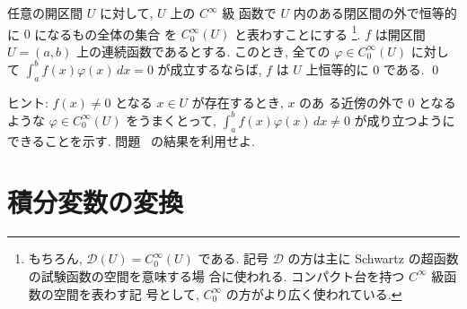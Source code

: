 \documentclass[12pt,twoside]{jarticle}
\newcommand\scr{\mathscr}
\begin{document}
\begin{question}[変分法の基本補題]
  任意の開区間 $U$ に対して, $U$ 上の $C^\infty$ 級
  函数で $U$ 内のある閉区間の外で恒等的に $0$ になるもの全体の集合
  を $C_0^\infty(U)$ と表わすことにする%
  \footnote{もちろん, $\scr{D}(U) = C_0^\infty(U)$ である. 記号 %
    $\scr{D}$ の方は主に Schwartz の超函数の試験函数の空間を意味する場
    合に使われる. コンパクト台を持つ $C^\infty$ 級函数の空間を表わす記
    号として, $C_0^\infty$ の方がより広く使われている.}. %
  $f$ は開区間 $U=(a,b)$ 上の連続函数であるとする. %
  このとき, 全ての $\varphi\in C_0^\infty(U)$ に対して%
  $\int_a^b f(x) \varphi(x) \,dx = 0$ が成立するならば, %
  $f$ は $U$ 上恒等的に $0$ である. \qed
\end{question}

\noindent ヒント: $f(x)\ne 0$ となる $x\in U$ が存在するとき, $x$ のあ
る近傍の外で $0$ となるような $\varphi\in C_0^\infty(U)$ をうまくとって, 
$\int_a^b f(x)\varphi(x)\,dx\ne 0$ が成り立つようにできることを示す. 
問題 \ の結果を利用せよ. 



\section{積分変数の変換}
\end{document}
